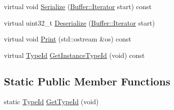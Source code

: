 \begin{DoxyCompactItemize}
\item 
virtual void \hyperlink{classns3_1_1UanHeaderRcRts_a2ed4d68df8b7e174a24f7e04c19e062b}{Serialize} (\hyperlink{classns3_1_1Buffer_1_1Iterator}{Buffer\+::\+Iterator} start) const 
\item 
virtual uint32\+\_\+t \hyperlink{classns3_1_1UanHeaderRcRts_a9bcdcf1b71a44c6b2c9f57dda00d7974}{Deserialize} (\hyperlink{classns3_1_1Buffer_1_1Iterator}{Buffer\+::\+Iterator} start)
\item 
virtual void \hyperlink{classns3_1_1UanHeaderRcRts_accd35bf90c0deca061f6156dd11b6624}{Print} (std\+::ostream \&os) const 
\item 
virtual \hyperlink{classns3_1_1TypeId}{Type\+Id} \hyperlink{classns3_1_1UanHeaderRcRts_ae5bfd4539fa4211cd01bb8aea051331a}{Get\+Instance\+Type\+Id} (void) const 
\end{DoxyCompactItemize}
\subsection*{Static Public Member Functions}
\begin{DoxyCompactItemize}
\item 
static \hyperlink{classns3_1_1TypeId}{Type\+Id} \hyperlink{classns3_1_1UanHeaderRcRts_a28df59b9a28e23220611324cfce6670b}{Get\+Type\+Id} (void)
\end{DoxyCompactItemize}
